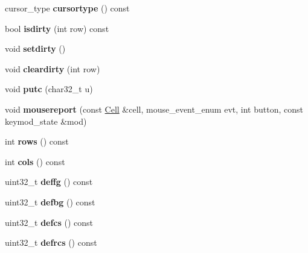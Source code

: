 \begin{DoxyCompactItemize}
\item 
\mbox{\label{classTerm_a2153d31f27f4e9313a3ca0f01bfda6c9}} 
cursor\+\_\+type {\bfseries cursortype} () const
\item 
\mbox{\label{classTerm_aa7dcebf1fd3755f2aac88ad5386898ff}} 
bool {\bfseries isdirty} (int row) const
\item 
\mbox{\label{classTerm_ad15c4f494538e36cf97f10604ebb6046}} 
void {\bfseries setdirty} ()
\item 
\mbox{\label{classTerm_a8465cf02137627df0b01a59dcd26c0d8}} 
void {\bfseries cleardirty} (int row)
\item 
\mbox{\label{classTerm_ab4bbb11a0a5a15640749b0081d2dc886}} 
void {\bfseries putc} (char32\+\_\+t u)
\item 
\mbox{\label{classTerm_ab8d1f6c594c4db03ece9ca7f6bc56f01}} 
void {\bfseries mousereport} (const \mbox{\hyperlink{structCell}{Cell}} \&cell, mouse\+\_\+event\+\_\+enum evt, int button, const keymod\+\_\+state \&mod)
\item 
\mbox{\label{classTerm_acf9f9282c9cc47f23dc2f07507efba59}} 
int {\bfseries rows} () const
\item 
\mbox{\label{classTerm_a003b2a16fd407f90def8d329449798ee}} 
int {\bfseries cols} () const
\item 
\mbox{\label{classTerm_abdde26215eaf6b6e0330530a31bc7323}} 
uint32\+\_\+t {\bfseries deffg} () const
\item 
\mbox{\label{classTerm_a45a07ccccbe6530c84abb44e6e53dc48}} 
uint32\+\_\+t {\bfseries defbg} () const
\item 
\mbox{\label{classTerm_aa0bed75e47443879fbff5150330ce903}} 
uint32\+\_\+t {\bfseries defcs} () const
\item 
\mbox{\label{classTerm_a4f230bc585ac7ef9449b7416f04d01be}} 
uint32\+\_\+t {\bfseries defrcs} () const
\item 
\mbox{\label{classTerm_a386556defdb343b7390114278664c895}} 

\end{DoxyCompactItemize}
